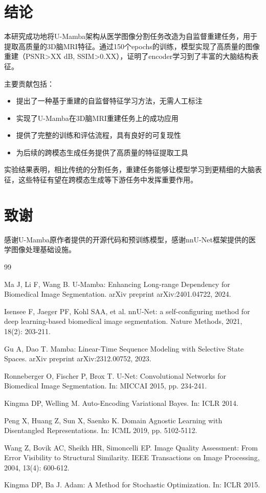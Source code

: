 \documentclass[11pt,a4paper]{article}
\begin{document}
\section{结论}

本研究成功地将U-Mamba架构从医学图像分割任务改造为自监督重建任务，用于提取高质量的3D脑MRI特征。通过150个epochs的训练，模型实现了高质量的图像重建（PSNR>XX dB, SSIM>0.XX），证明了encoder学习到了丰富的大脑结构表征。

主要贡献包括：
\begin{itemize}
    \item 提出了一种基于重建的自监督特征学习方法，无需人工标注
    \item 实现了U-Mamba在3D脑MRI重建任务上的成功应用
    \item 提供了完整的训练和评估流程，具有良好的可复现性
    \item 为后续的跨模态生成任务提供了高质量的特征提取工具
\end{itemize}

实验结果表明，相比传统的分割任务，重建任务能够让模型学习到更精细的大脑表征，这些特征有望在跨模态生成等下游任务中发挥重要作用。

\section*{致谢}

感谢U-Mamba原作者提供的开源代码和预训练模型，感谢nnU-Net框架提供的医学图像处理基础设施。

\begin{thebibliography}{99}

Ma J, Li F, Wang B.
U-Mamba: Enhancing Long-range Dependency for Biomedical Image Segmentation.
arXiv preprint arXiv:2401.04722, 2024.

Isensee F, Jaeger PF, Kohl SAA, et al.
nnU-Net: a self-configuring method for deep learning-based biomedical image segmentation.
Nature Methods, 2021, 18(2): 203-211.

Gu A, Dao T.
Mamba: Linear-Time Sequence Modeling with Selective State Spaces.
arXiv preprint arXiv:2312.00752, 2023.

Ronneberger O, Fischer P, Brox T.
U-Net: Convolutional Networks for Biomedical Image Segmentation.
In: MICCAI 2015, pp. 234-241.

Kingma DP, Welling M.
Auto-Encoding Variational Bayes.
In: ICLR 2014.

Peng X, Huang Z, Sun X, Saenko K.
Domain Agnostic Learning with Disentangled Representations.
In: ICML 2019, pp. 5102-5112.

Wang Z, Bovik AC, Sheikh HR, Simoncelli EP.
Image Quality Assessment: From Error Visibility to Structural Similarity.
IEEE Transactions on Image Processing, 2004, 13(4): 600-612.

Kingma DP, Ba J.
Adam: A Method for Stochastic Optimization.
In: ICLR 2015.

\end{thebibliography}
\end{document}
